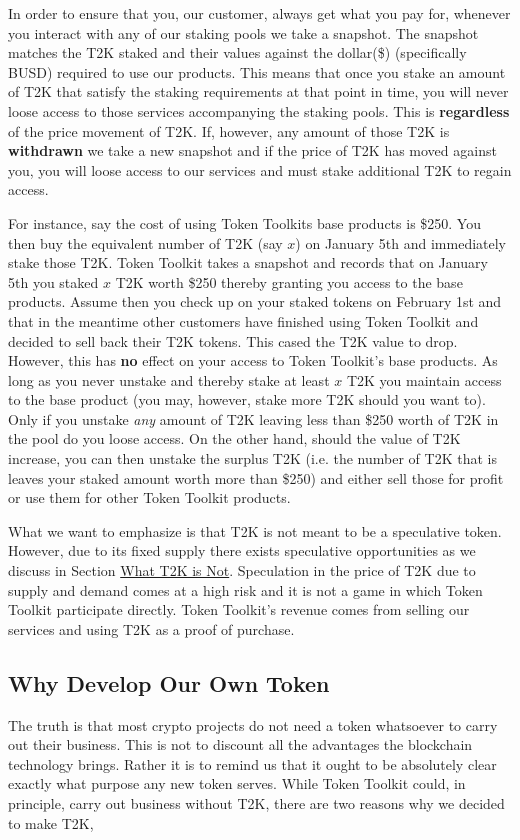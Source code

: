 \documentclass[11pt]{article}
\begin{document}
In order to ensure that you, our customer, always get what you pay for, whenever
you interact with any of our staking pools we take a snapshot. The snapshot
matches the T2K staked and their values against the dollar(\$) (specifically
BUSD) required to use our products. This means that once you stake an amount of
T2K that satisfy the staking requirements at that point in time, you will never
loose access to those services accompanying the staking pools. This is
\textbf{regardless} of the price movement of T2K. If, however, any amount of those T2K
is \textbf{withdrawn} we take a new snapshot and if the price of T2K has moved against
you, you will loose access to our services and must stake additional T2K to
regain access.

For instance, say the cost of using Token Toolkits base products is \$250. You
then buy the equivalent number of T2K (say \(x\)) on January 5th and immediately
stake those T2K. Token Toolkit takes a snapshot and records that on January 5th
you staked \(x\) T2K worth \$250 thereby granting you access to the base products.
Assume then you check up on your staked tokens on February 1st and that in the
meantime other customers have finished using Token Toolkit and decided to sell
back their T2K tokens. This cased the T2K value to drop. However, this has \textbf{no}
effect on your access to Token Toolkit's base products. As long as you never
unstake and thereby stake at least \(x\) T2K you maintain access to the base
product (you may, however, stake more T2K should you want to). Only if you
unstake \emph{any} amount of T2K leaving less than \$250 worth of T2K in the pool do
you loose access. On the other hand, should the value of T2K increase, you can
then unstake the surplus T2K (i.e. the number of T2K that is leaves your staked
amount worth more than \$250) and either sell those for profit or use them for
other Token Toolkit products.

What we want to emphasize is that T2K is not meant to be a speculative token.
However, due to its fixed supply there exists speculative opportunities as we
discuss in Section \hyperref[sec:orgfff7193]{What T2K is Not}. Speculation in the price of T2K due to
supply and demand comes at a high risk and it is not a game in which Token
Toolkit participate directly. Token Toolkit's revenue comes from selling our
services and using T2K as a proof of purchase.

\subsection*{Why Develop Our Own Token}
\label{sec:org19c6ce3}
The truth is that most crypto projects do not need a token whatsoever to carry
out their business. This is not to discount all the advantages the blockchain
technology brings. Rather it is to remind us that it ought to be absolutely
clear exactly what purpose any new token serves. While Token Toolkit could, in
principle, carry out business without T2K, there are two reasons why we decided
to make T2K,
\end{document}
